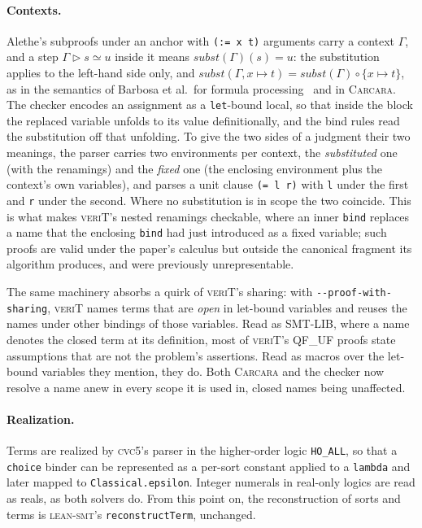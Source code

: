 \documentclass[runningheads]{llncs}
\newcommand{\cvcv}{\textsc{cvc5}\xspace}
\newcommand{\tactic}{\textsc{lean-smt}\xspace}
\newcommand{\carcara}{\textsc{Carcara}\xspace}
\newcommand{\verit}{\textsc{veriT}\xspace}
\newcommand{\alethe}{Alethe\xspace}
\newcommand{\rulename}[1]{\texttt{#1}}
\newcommand{\subst}{\ensuremath{\mathit{subst}}}
\begin{document}
\paragraph{Contexts.} \alethe's subproofs under an anchor with
\texttt{(:= x t)} arguments carry a context $\Gamma$, and a step
$\Gamma \triangleright s \simeq u$ inside it means $\subst(\Gamma)(s) = u$: the
substitution applies to the left-hand side only, and
$\subst(\Gamma, x \mapsto t) = \subst(\Gamma) \circ \{x \mapsto t\}$, as in
the semantics of Barbosa et al.\ for formula processing~\cite{Barbosa2020}
and in \carcara. The checker encodes an assignment as a \texttt{let}-bound
local, so that inside the block the replaced variable unfolds to its value
definitionally, and the bind rules read the substitution off that unfolding.
To give the two sides of a judgment their two meanings, the parser carries
two environments per context, the \emph{substituted} one (with the
renamings) and the \emph{fixed} one (the enclosing environment plus the
context's own variables), and parses a unit clause \texttt{(= l r)} with
\texttt{l} under the first and \texttt{r} under the second. Where no
substitution is in scope the two coincide. This is what makes \verit's
nested renamings checkable, where an inner \rulename{bind} replaces a name
that the enclosing \rulename{bind} had just introduced as a fixed variable; such proofs are valid under the paper's calculus but outside the canonical
fragment its algorithm produces, and were previously unrepresentable.

The same machinery absorbs a quirk of \verit's sharing: with
\texttt{-{}-proof-with-sharing}, \verit names terms that are \emph{open} in
let-bound variables and reuses the names under other bindings of those
variables. Read as SMT-LIB, where a name denotes the closed term at its
definition, most of \verit's QF\_UF proofs state assumptions that are not the
problem's assertions. Read as macros over the let-bound variables they
mention, they do. Both \carcara and the checker now resolve a name anew in
every scope it is used in, closed names being unaffected.

\paragraph{Realization.} Terms are realized by \cvcv's parser in the
higher-order logic \texttt{HO\_ALL}, so that a \texttt{choice} binder can be
represented as a per-sort constant applied to a \texttt{lambda} and later
mapped to \texttt{Classical.epsilon}. Integer numerals in real-only logics
are read as reals, as both solvers do. From this point on, the reconstruction
of sorts and terms is \tactic's \texttt{reconstructTerm}, unchanged.
\end{document}
